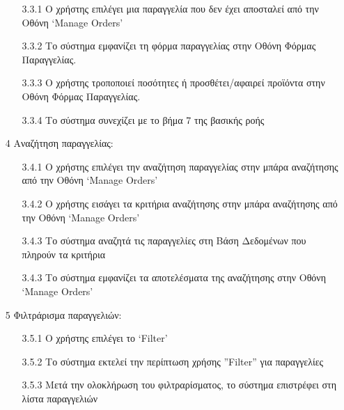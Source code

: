 \documentclass[12pt,a4paper,twoside]{book}
\begin{document}
\begin{enumerate}
        \begin{enumerate}
          \item[3.3.1 ] Ο χρήστης επιλέγει μια παραγγελία που δεν έχει αποσταλεί από την Οθόνη `Manage Orders' %
          \item[3.3.2 ] Το σύστημα εμφανίζει τη φόρμα παραγγελίας στην Οθόνη Φόρμας Παραγγελίας.
          \item[3.3.3 ] Ο χρήστης τροποποιεί ποσότητες ή προσθέτει/αφαιρεί προϊόντα στην Οθόνη Φόρμας Παραγγελίας.
          \item[3.3.4 ] Το σύστημα συνεχίζει με το βήμα 7 της βασικής ροής %
        \end{enumerate}
  \item[4 ] Αναζήτηση παραγγελίας:
        \begin{enumerate}
          \item[3.4.1 ] Ο χρήστης επιλέγει την αναζήτηση παραγγελίας στην μπάρα αναζήτησης από την Οθόνη `Manage Orders' %
          \item[3.4.2 ] Ο χρήστης εισάγει τα κριτήρια αναζήτησης στην μπάρα αναζήτησης από την Οθόνη `Manage Orders' %
          \item[3.4.3 ] Το σύστημα αναζητά τις παραγγελίες στη Βάση Δεδομένων που πληρούν τα κριτήρια %
          \item[3.4.3 ] Το σύστημα εμφανίζει τα αποτελέσματα της αναζήτησης στην Οθόνη `Manage Orders' %
        \end{enumerate}
  \item[5 ] Φιλτράρισμα παραγγελιών:
        \begin{enumerate}
          \item[3.5.1 ] Ο χρήστης επιλέγει το `Filter' %
          \item[3.5.2 ] Το σύστημα εκτελεί την περίπτωση χρήσης ”Filter” για παραγγελίες
          \item[3.5.3 ] Μετά την ολοκλήρωση του φιλτραρίσματος, το σύστημα επιστρέφει στη λίστα παραγγελιών
        \end{enumerate}
\end{enumerate}
\end{document}
